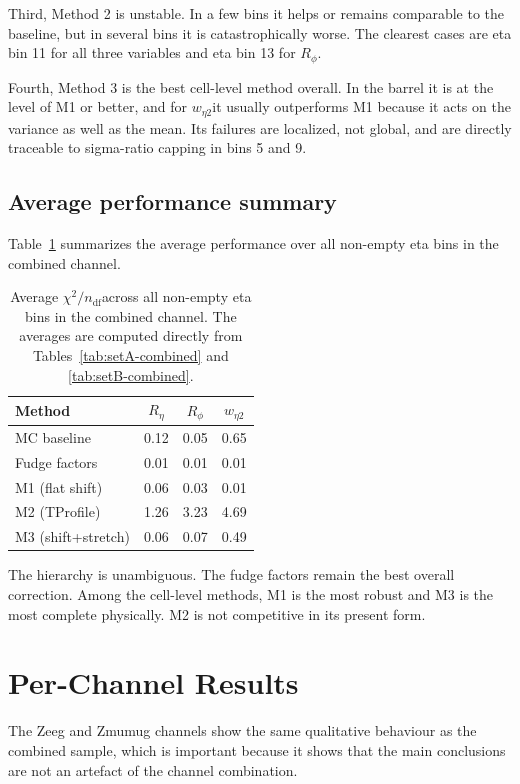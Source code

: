 \documentclass[11pt,a4paper]{article}
\newcommand{\Reta}{\ensuremath{R_{\eta}}}
\newcommand{\Rphi}{\ensuremath{R_{\phi}}}
\newcommand{\weta}{\ensuremath{w_{\eta 2}}}
\newcommand{\chisq}{\ensuremath{\chi^2 / n_{\mathrm{df}}}}
\begin{document}
Third, Method 2 is unstable. In a few bins it helps or remains comparable to the
baseline, but in several bins it is catastrophically worse. The clearest cases
are eta bin 11 for all three variables and eta bin 13 for \Rphi.

Fourth, Method 3 is the best cell-level method overall. In the barrel it is at
the level of M1 or better, and for \weta it usually outperforms M1 because it
acts on the variance as well as the mean. Its failures are localized, not
global, and are directly traceable to sigma-ratio capping in bins 5 and 9.

\subsection{Average performance summary}

Table~\ref{tab:average-chi2} summarizes the average performance over all
non-empty eta bins in the combined channel.

\begin{table}[H]
\centering
\caption{Average \chisq across all non-empty eta bins in the combined channel. The averages are computed directly from Tables~\ref{tab:setA-combined} and \ref{tab:setB-combined}.}
\label{tab:average-chi2}
\begin{tabular}{lccc}
\toprule
Method & $\Reta$ & $\Rphi$ & $\weta$ \\
\midrule
MC baseline & 0.12 & 0.05 & 0.65 \\
Fudge factors & 0.01 & 0.01 & 0.01 \\
M1 (flat shift) & 0.06 & 0.03 & 0.01 \\
M2 (TProfile) & 1.26 & 3.23 & 4.69 \\
M3 (shift+stretch) & 0.06 & 0.07 & 0.49 \\
\bottomrule
\end{tabular}
\end{table}

The hierarchy is unambiguous. The fudge factors remain the best overall
correction. Among the cell-level methods, M1 is the most robust and M3 is the
most complete physically. M2 is not competitive in its present form.

\section{Per-Channel Results}

The Zeeg and Zmumug channels show the same qualitative behaviour as the
combined sample, which is important because it shows that the main conclusions
are not an artefact of the channel combination.
\end{document}
